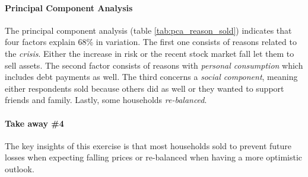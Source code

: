 \documentclass[ProjectABM]{subfiles}
\begin{document}
\paragraph{Principal Component Analysis}
The principal component analysis (table \ref{tab:pca_reason_sold}) indicates that four factors explain 68\% in variation. The first one consists of reasons related to the \textit{crisis}. Either the increase in risk or the recent stock market fall let them to sell assets. The second factor consists of reasons with \textit{personal consumption} which includes debt payments as well. The third concerns a \textit{social component}, meaning either respondents sold because others did as well or they wanted to support friends and family. Lastly, some households \textit{re-balanced}.



\paragraph{Take away \#4}
The key insights of this exercise is that most households sold to prevent future losses when expecting falling prices or re-balanced when having a more optimistic outlook. %



\end{document}
